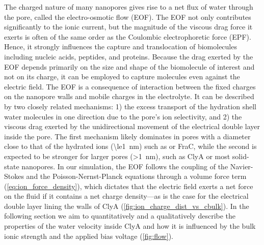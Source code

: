 \documentclass[journal=ancac3,manuscript=article,etalmode=truncate,maxauthors=0,layout=onecolumn]{achemso}
\begin{document}
The charged nature of many nanopores gives rise to a net flux of water through the pore, called the
electro-osmotic flow (EOF).\cite{Qiao-Aluru-2003,Thompson-2003,Mao-2014} The EOF not only contributes
significantly to the ionic current, but the magnitude of the viscous drag force it exerts is often of the same
order as the Coulombic electrophoretic force (EPF). Hence, it strongly influences the capture and
translocation of biomolecules including nucleic acids,\cite{Wong-2007,Luan-2008,Firnkes-2010}
peptides,\cite{Huang-2017,Li-2018,Huang-2019} and
proteins.\cite{Soskine-2012,Soskine-2013,VanMeervelt-2014,Soskine-Biesemans-2015,Biesemans-Soskine-2015,Wloka-2017,Galenkamp-2018,Willems-Ruic-Biesemans-2019}
Because the drag exerted by the EOF depends primarily on the size and shape of the biomolecule of interest and
not on its charge,\cite{Willems-Ruic-Biesemans-2019} it can be employed to capture molecules even against the
electric field.\cite{Soskine-2012} The EOF is a consequence of interaction between the fixed charges on the
nanopore walls and mobile charges in the electrolyte. It can be described by two closely related mechanisms:
1) the excess transport of the hydration shell water molecules in one direction due to the pore's ion
selectivity, and 2) the viscous drag exerted by the unidirectional movement of the electrical double layer
inside the pore. The first mechanism likely dominates in pores with a diameter close to that of the hydrated
ions (\SI{\le1}{\nm}) such as \ahl{} or FraC,\cite{Huang-2017,Huang-2019} while the second is expected to be
stronger for larger pores (\SI{>1}{\nm}), such as ClyA\cite{Soskine-2012,Willems-Ruic-Biesemans-2019} or most
solid-state nanopores.\cite{Mao-2014,Laohakunakorn-2015} In our simulation, the EOF follows the coupling of
the Navier-Stokes and the Poisson-Nernst-Planck equations through a volume force term
(\cref{eq:ion_force_density}), which dictates that the electric field exerts a net force on the fluid if it
contains a net charge density---as is the case for the electrical double layer lining the walls of ClyA
(\cref{fig:ion_charge_dist_vs_cbulk}). In the following section we aim to quantitatively and a qualitatively
describe the properties of the water velocity inside ClyA and how it is influenced by the bulk ionic strength
and the applied bias voltage (\cref{fig:flow}).
\end{document}
